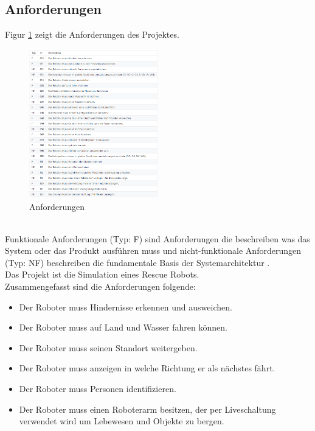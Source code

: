 \subsection{Anforderungen}
Figur \ref{fig:anforderungen} zeigt die Anforderungen des Projektes.
\begin{figure}[htbp] 
  \centering
     \includegraphics[width=0.5\textwidth]{Bilder/requirements.PNG}
  \caption{Anforderungen}
  \label{fig:anforderungen}
\end{figure}\\
Funktionale Anforderungen (Typ: F) sind Anforderungen die beschreiben was das System oder das Produkt ausführen muss \cite{b1} und nicht-funktionale Anforderungen (Typ: NF) beschreiben die fundamentale Basis der Systemarchitektur \cite{b2}.\\
Das Projekt ist die Simulation eines Rescue Robots.\\
Zusammengefasst sind die Anforderungen folgende: 
\begin{itemize}
    \item Der Roboter muss Hindernisse erkennen und ausweichen.
    \item Der Roboter muss auf Land und Wasser fahren können.
    \item Der Roboter muss seinen Standort weitergeben.
    \item Der Roboter muss anzeigen in welche Richtung er als nächstes fährt.
    \item Der Roboter muss Personen identifizieren.
    \item Der Roboter muss einen Roboterarm besitzen, der per Liveschaltung verwendet wird um Lebewesen und Objekte zu bergen.
\end{itemize}
